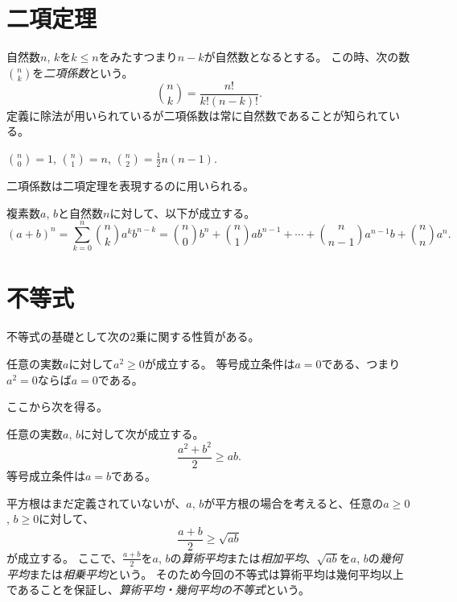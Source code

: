 \section{二項定理}

自然数$n$, $k$を$k \le n$をみたすつまり$n-k$が自然数となるとする。
この時、次の数$\binom{n}{k}$を\emph{二項係数}という。
$$
\binom{n}{k} = \frac{n!}{k!(n-k)!}.
$$
定義に除法が用いられているが二項係数は常に自然数であることが知られている。

\begin{example}
$\binom{n}{0} = 1$, $\binom{n}{1} = n$, $\binom{n}{2} = \frac{1}{2}n(n-1)$.
\end{example}

二項係数は二項定理を表現するのに用いられる。

\begin{proposition}[二項定理]
複素数$a$, $b$と自然数$n$に対して、以下が成立する。
$$
(a+b)^n = \sum_{k = 0}^n \binom{n}{k}a^k b^{n-k} = \binom{n}{0}b^n+\binom{n}{1}a b^{n-1}+\cdots+\binom{n}{n-1}a^{n-1}b+\binom{n}{n}a^n.
$$
\end{proposition}

\section{不等式}

不等式の基礎として次の$2$乗に関する性質がある。

\begin{proposition}
任意の実数$a$に対して$a^2 \ge 0$が成立する。
等号成立条件は$a = 0$である、つまり$a^2 = 0$ならば$a = 0$である。
\end{proposition}

ここから次を得る。

\begin{proposition}
任意の実数$a$, $b$に対して次が成立する。
$$
\frac{a^2+b^2}{2} \ge a b.
$$
等号成立条件は$a = b$である。
\end{proposition}

\begin{remark}
平方根はまだ定義されていないが、$a$, $b$が平方根の場合を考えると、任意の$a \ge 0$, $b \ge 0$に対して、
$$
\frac{a+b}{2} \ge \sqrt{a b}
$$
が成立する。
ここで、$\frac{a+b}{2}$を$a$, $b$の\emph{算術平均}または\emph{相加平均}、$\sqrt{a b}$を$a$, $b$の\emph{幾何平均}または\emph{相乗平均}という。
そのため今回の不等式は算術平均は幾何平均以上であることを保証し、\emph{算術平均・幾何平均の不等式}という。
\end{remark}


